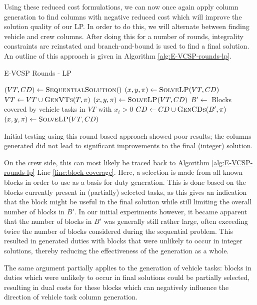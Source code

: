 \documentclass[]{article}
\begin{document}
Using these reduced cost formulations, we can now once again apply column generation to find columns with negative reduced cost which will improve the solution quality of our LP. In order to do this, we will alternate between finding vehicle and crew columns. After doing this for a number of rounds, integrality constraints are reinstated and branch-and-bound is used to find a final solution. An outline of this approach is given in Algorithm \ref{alg:E-VCSP-rounds-lp}. 

\begin{algorithm}[h]
\caption{E-VCSP Rounds - LP}\label{alg:E-VCSP-rounds-lp}
\begin{algorithmic}[1]
\State $(VT, CD) \gets \Call{SequentialSolution}$
\State $(x, y, \pi) \gets \Call{SolveLP}{VT, CD}$
    \State $VT \gets VT \cup \Call{GenVTs}{T, \pi}$
    \State $(x, y, \pi) \gets \Call{SolveLP}{VT, CD}$
  \EndFor
    \State $B' \gets$ Blocks covered by vehicle tasks in $VT$ with $x_i > 0$ \label{line:block-coverage}
    \State $CD \gets CD \cup \Call{GenCDs}{B', \pi}$
    \State $(x, y, \pi) \gets \Call{SolveLP}{VT, CD}$
  \EndFor
\EndFor
{}
\end{algorithmic}
\end{algorithm}

Initial testing using this round based approach showed poor results; the columns generated did not lead to significant improvements to the final (integer) solution. 

On the crew side, this can most likely be traced back to Algorithm \ref{alg:E-VCSP-rounds-lp} Line {\ref{line:block-coverage}}. Here, a selection is made from all known blocks in order to use as a basis for duty generation. This is done based on the blocks currently present in (partially) selected tasks, as this gives an indication that the block might be useful in the final solution while still limiting the overall number of blocks in $B'$. In our initial experiments however, it became apparent that the number of blocks in $B'$ was generally still rather large, often exceeding twice the number of blocks considered during the sequential problem. This resulted in generated duties with blocks that were unlikely to occur in integer solutions, thereby reducing the effectiveness of the generation as a whole.

The same argument partially applies to the generation of vehicle tasks: blocks in duties which were unlikely to occur in final solutions could be partially selected, resulting in dual costs for these blocks which can negatively influence the direction of vehicle task column generation. 
\end{document}
